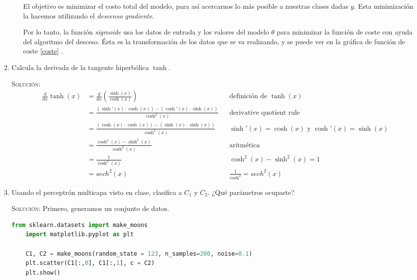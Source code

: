 \documentclass[letterpaper,11pt]{article}
\begin{document}
\begin{enumerate}
\begin{enumerate}
        El objetivo es minimizar el costo total del modelo, para así acercarnos
        lo más posible a nuestras clases dadas $y$. Esta minimización la 
        hacemos utilizando el \textit{descenso gradiente}. 

        Por lo tanto, la función \textit{sigmoide} usa los datos de entrada y 
        los valores del modelo $\theta$ para minimizar la función de coste con 
        ayuda del algoritmo del desceso. Ésta es la transformación de los 
        datos que se va realizando, y se puede ver en la gráfica de 
        función de coste \ref{coste} . 
    \end{enumerate}

    \newpage
    \item Calcula la derivada de la tangente hiperbólica $\tanh$.
    
    \textsc{Solución:}
    \begin{align*}
        \frac{d}{dx} \tanh (x) 
        &= \frac{d}{dx} \left(\frac{\sinh (x)}{\cosh (x)}\right)
        && \text{definición de $\tanh (x)$} \\
        &= \frac{(\sinh' (x) \cdot \cosh (x)) - (\cosh' (x) \cdot \sinh (x))}
                {\cosh^2 (x)}
        && \text{derivative quotient rule} \\ 
        &= \frac{(\cosh (x) \cdot \cosh (x)) - (\sinh (x) \cdot \sinh (x))}
                {\cosh^2 (x)}
        && \text{$\sinh' (x) = \cosh (x)$ y $\cosh' (x) = \sinh (x)$} \\ 
        &= \frac{\cosh^2 (x) - \sinh^2 (x)}{\cosh^2 (x)}
        && \text{aritmética} \\ 
        &= \frac{1}{\cosh^2 (x)}
        && \text{$\cosh^2 (x) - \sinh^2 (x) = 1$} \\ 
        &= sech^2 (x)
        && \text{$\frac{1}{\cosh^2} = sech^2 (x)$}
    \end{align*}

    \item Usando el perceptrón multicapa visto en clase, clasifica a $C_1$ y 
    $C_2$. ¿Qué parámetros ocupaste?

    \textsc{Solución:} Primero, generamos un conjunto de datos. 
    \begin{lstlisting}[language=Python]
    from sklearn.datasets import make_moons
    import matplotlib.pyplot as plt

    C1, C2 = make_moons(random_state = 123, n_samples=200, noise=0.1)
    plt.scatter(C1[:,0], C1[:,1], c = C2)
    plt.show()
    \end{lstlisting}


\end{enumerate}
\end{document}
